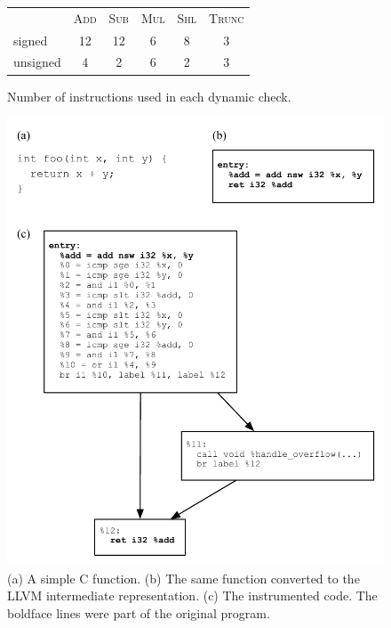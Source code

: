 \documentclass{sigplanconf}[10pt]
\begin{document}
\begin{figure}[t!]
\begin{center}
\begin{small}
\renewcommand{\arraystretch}{1.5}
\begin{tabular}{lccccc}
& \textsc{Add} & \textsc{Sub} & \textsc{Mul} & \textsc{Shl} & \textsc{Trunc} \\
signed   & 12 & 12 & 6 & 8 & 3 \\
unsigned & 4  & 2  & 6 & 2 & 3
\end{tabular}
\end{small}
\caption{\label{fig:num_instructions}
Number of instructions used in each dynamic check.}
\end{center}
\end{figure}

\begin{figure}[t!]
\begin{center}
\includegraphics[width=\columnwidth]{images/instrumented_cfg}
\end{center}
\caption{\label{fig:instrumented_cfg}
(a) A simple C function.
(b) The same function converted to the LLVM intermediate representation.
(c) The instrumented code. The boldface lines were part of the original
program.}
\end{figure}
\end{document}
